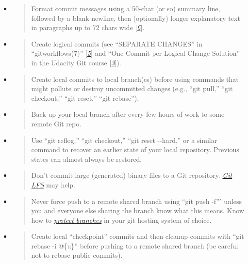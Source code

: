 \documentclass[]{article}
\begin{document}
\begin{itemize}
\item
  \begin{quote}
  Format commit messages using a 50-char (or so) summary line, followed
  by a blank newline, then (optionally) longer explanatory text in
  paragraphs up to 72 chars wide
  {[}\protect\hyperlink{id.duiqy3srokip}{\emph{6}}{]}.
  \end{quote}
\item
  \begin{quote}
  Create logical commits (see ``SEPARATE CHANGES'' in
  ``gitworkflows(7)''
  {[}\protect\hyperlink{id.m6th6vxlbrrd}{\emph{5}}{]} and ``One Commit
  per Logical Change Solution'' in the Udacity Git course
  {[}\protect\hyperlink{id.91we93wr27j3}{\emph{3}}{]}).
  \end{quote}
\item
  \begin{quote}
  Create local commits to local branch(es) before using commands that
  might pollute or destroy uncommitted changes (e.g., ``git pull,''
  ``git checkout,'' ``git reset,'' ``git rebase'').
  \end{quote}
\item
  \begin{quote}
  Back up your local branch after every few hours of work to some remote
  Git repo.
  \end{quote}
\item
  \begin{quote}
  Use ``git reflog,'' ``git checkout,'' ``git reset -\/-hard,'' or a
  similar command to recover an earlier state of your local repository.
  Previous states can almost always be restored.
  \end{quote}
\item
  \begin{quote}
  Don't commit large (generated) binary files to a Git repository.
  \href{https://git-lfs.github.com}{\emph{Git LFS}} may help.
  \end{quote}
\item
  \begin{quote}
  Never force push to a remote shared branch using ``git push -f'''
  unless you and everyone else sharing the branch know what this means.
  Know how to
  \href{https://github.com/blog/2051-protected-branches-and-required-status-checks}{\emph{protect
  branches}} in your git hosting system of choice.
  \end{quote}
\item
  \begin{quote}
  Create local ``checkpoint'' commits and then cleanup commits with
  ``git rebase -i @\{u\}'' before pushing to a remote shared branch (be
  careful not to rebase public commits).
  \end{quote}
\end{itemize}
\end{document}

